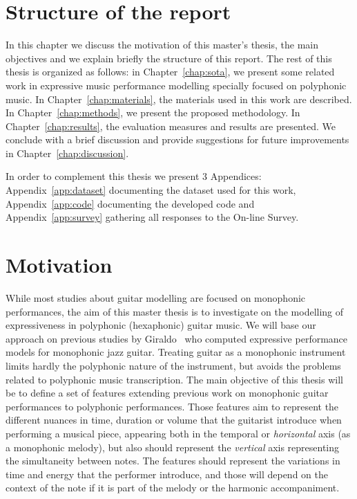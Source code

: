 \section{Structure of the report}
\label{sec:structure}
In this chapter we discuss the motivation of this master's thesis, the main objectives and we explain briefly the structure of this report.
The rest of this thesis is organized as follows: in Chapter~\ref{chap:sota}, we present some related work in expressive music performance modelling specially focused on polyphonic music. In Chapter~\ref{chap:materials}, the materials used in this work are described. In Chapter~\ref{chap:methods}, we present the proposed methodology. In Chapter~\ref{chap:results}, the evaluation measures and results are presented. We conclude with a brief discussion and provide suggestions for future improvements in Chapter~\ref{chap:discussion}. 

In order to complement this thesis we present 3 Appendices: Appendix~\ref{app:dataset} documenting the dataset used for this work, Appendix~\ref{app:code} documenting the developed code and Appendix~\ref{app:survey} gathering all responses to the On-line Survey.

\section{Motivation}
\label{sec:motivation}
While most studies about guitar modelling are focused on monophonic performances, the aim of this master thesis is to investigate on the modelling of expressiveness in polyphonic (hexaphonic) guitar music. We will base our approach on previous studies by Giraldo~\cite{Giraldo2016} who computed expressive performance models for monophonic jazz guitar. Treating guitar as a monophonic instrument limits hardly the polyphonic nature of the instrument, but avoids the problems related to polyphonic music transcription. The main objective of this thesis will be to define a set of features extending previous work on monophonic guitar performances to polyphonic performances. Those features aim to represent the different nuances in time, duration or volume that the guitarist introduce when performing a musical piece, appearing both in the temporal or \textit{horizontal} axis (as a monophonic melody), but also should represent the \textit{vertical} axis representing the simultaneity between notes. The features should represent the variations in time and energy that the performer introduce, and those will depend on the context of the note if it is part of the melody or the harmonic accompaniment.

